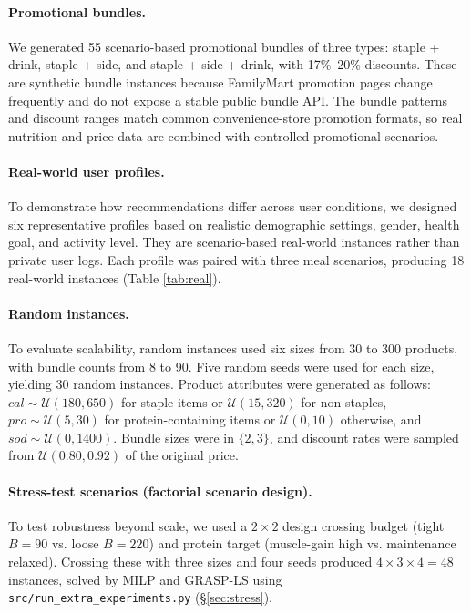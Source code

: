\documentclass[a4paper]{article}
\begin{document}
\paragraph{Promotional bundles.}We generated 55 scenario-based promotional bundles of three types: staple + drink, staple + side, and staple + side + drink, with 17\%--20\% discounts. These are synthetic bundle instances because FamilyMart promotion pages change frequently and do not expose a stable public bundle API. The bundle patterns and discount ranges match common convenience-store promotion formats, so real nutrition and price data are combined with controlled promotional scenarios.

\paragraph{Real-world user profiles.}To demonstrate how recommendations differ across user conditions, we designed six representative profiles based on realistic demographic settings, gender, health goal, and activity level. They are scenario-based real-world instances rather than private user logs. Each profile was paired with three meal scenarios, producing 18 real-world instances (Table \ref{tab:real}).

\paragraph{Random instances.}To evaluate scalability, random instances used six sizes from 30 to 300 products, with bundle counts from 8 to 90. Five random seeds were used for each size, yielding 30 random instances. Product attributes were generated as follows: $cal\sim \mathcal{U}(180,650)$ for staple items or $\mathcal{U}(15,320)$ for non-staples, $pro\sim \mathcal{U}(5,30)$ for protein-containing items or $\mathcal{U}(0,10)$ otherwise, and $sod\sim \mathcal{U}(0,1400)$. Bundle sizes were in $\{2,3\}$, and discount rates were sampled from $\mathcal{U}(0.80,0.92)$ of the original price.

\paragraph{Stress-test scenarios (factorial scenario design).}To test robustness beyond scale, we used a $2\times2$ design crossing budget (tight $B=90$ vs. loose $B=220$) and protein target (muscle-gain high vs. maintenance relaxed). Crossing these with three sizes and four seeds produced $4\times3\times4=48$ instances, solved by MILP and GRASP-LS using \texttt{src/run\_extra\_experiments.py} (\S\ref{sec:stress}).
\end{document}

